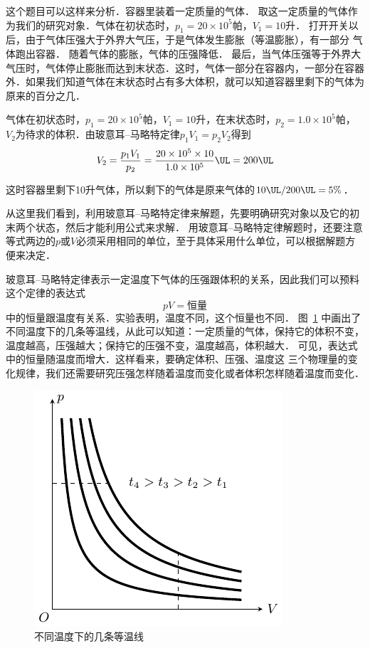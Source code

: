 \begin{solution}
这个题目可以这样来分析．容器里装着一定质量的气体．
取这一定质量的气体作为我们的研究对象．气体在初状态时，$p_1=20\times 10^5$帕，$V_1=10$升．
打开开关以后，由于气体压强大于外界大气压，于是气体发生膨胀（等温膨胀），有一部分
气体跑出容器．
随着气体的膨胀，气体的压强降低．
最后，当气体压强等于外界大气压时，气体停止膨胀而达到末状态．这时，气体一部分在容器内，一部分在容器外．如果我们知道气体在末状态时占有多大体积，就可以知道容器里剩下的气体为原来的百分之几．

气体在初状态时，$p_1=20\times 10^5$帕，$V_1=10$升，在末状态时，$p_2=1.0\times 10^5$帕，$V_2$为待求的体积．由玻意耳--马略特定律$p_1V_1=p_2V_2$得到
\[V_2=\frac{p_1V_1}{p_2}=\frac{20\times 10^5\times 10}{1.0\times 10^5} \UL =200\UL \]

这时容器里剩下10升气体，所以剩下的气体是原来气体的$10 \UL /200\UL=5\%$．
\end{solution}

从这里我们看到，利用玻意耳--马略特定律来解题，先要明确研究对象以及它的初末两个状态，然后才能利用公式来求解．
用玻意耳--马略特定律解题时，还要注意等式两边的$p$或$V$必须采用相同的单位，至于具体采用什么单位，可以根据解题方便来决定．

玻意耳--马略特定律表示一定温度下气体的压强跟体积的关系，因此我们可以预料这个定律的表达式
\[pV=\text{恒量} \]
中的恒量跟温度有关系．实验表明，温度不同，这个恒量也不同．
图~\ref{fig_B_3-7} 中画出了不同温度下的几条等温线，从此可以知道：一定质量的气体，保持它的体积不变，温度越高，压强越大；保持它的压强不变，温度越高，体积越大．
可见，表达式中的恒量随温度而增大．这样看来，要确定体积、压强、温度这
三个物理量的变化规律，我们还需要研究压强怎样随着温度而变化或者体积怎样随着温度而变化．
\begin{figure}[htbp]
    \centering
    \includegraphics{fig/B/3-7.pdf}
    \caption{不同温度下的几条等温线}\label{fig_B_3-7}
\end{figure}



